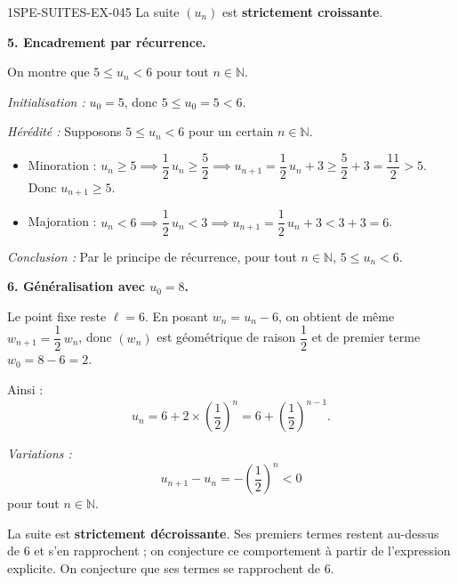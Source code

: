 \begin{corrige}{1SPE-SUITES-EX-045}
La suite $(u_n)$ est \textbf{strictement croissante}.

\textbf{5. Encadrement par récurrence.}


On montre que $5 \leq u_n < 6$ pour tout $n \in \mathbb{N}$.

\textit{Initialisation :} $u_0 = 5$, donc $5 \leq u_0 = 5 < 6$. \checkmark

\textit{Hérédité :} Supposons $5 \leq u_n < 6$ pour un certain $n \in \mathbb{N}$.

\begin{itemize}
  \item Minoration : $u_n \geq 5 \implies \dfrac{1}{2}\,u_n \geq \dfrac{5}{2} \implies u_{n+1} = \dfrac{1}{2}\,u_n + 3 \geq \dfrac{5}{2} + 3 = \dfrac{11}{2} > 5$. Donc $u_{n+1} \geq 5$. \checkmark
  \item Majoration : $u_n < 6 \implies \dfrac{1}{2}\,u_n < 3 \implies u_{n+1} = \dfrac{1}{2}\,u_n + 3 < 3 + 3 = 6$. \checkmark
\end{itemize}

\textit{Conclusion :} Par le principe de récurrence, pour tout $n \in \mathbb{N}$, $5 \leq u_n < 6$.

\textbf{6. Généralisation avec $u_0 = 8$.}


Le point fixe reste $\ell = 6$. En posant $w_n = u_n - 6$, on obtient de même $w_{n+1} = \dfrac{1}{2}\,w_n$, donc $(w_n)$ est géométrique de raison $\dfrac{1}{2}$ et de premier terme $w_0 = 8 - 6 = 2$.

Ainsi :
\[
u_n = 6 + 2 \times \left(\frac{1}{2}\right)^n = 6 + \left(\frac{1}{2}\right)^{n-1}.
\]

\textit{Variations :}
\[
u_{n+1}-u_n=-\left(\frac12\right)^n<0
\]
pour tout $n \in \mathbb{N}$.

La suite est \textbf{strictement décroissante}. Ses premiers termes restent au-dessus de $6$ et s'en rapprochent ; on conjecture ce comportement à partir de l'expression explicite. On conjecture que ses termes se rapprochent de $6$.

\end{corrige}
